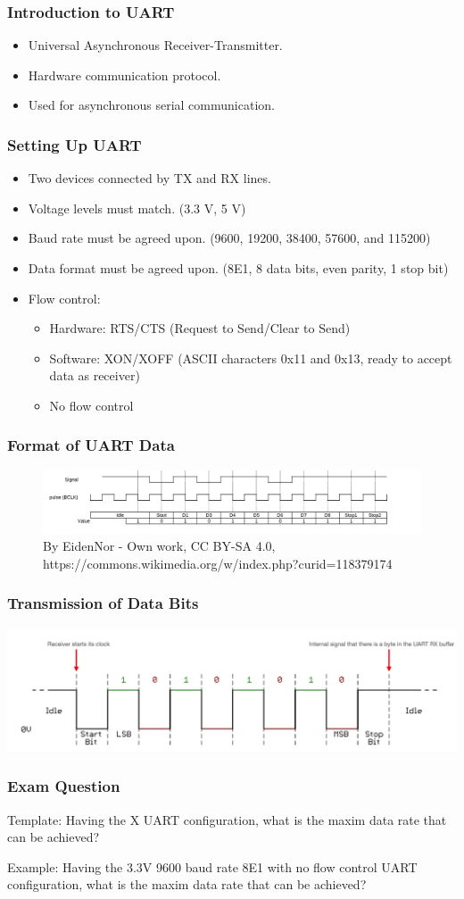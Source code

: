 
\begin{frame}
    \frametitle{Introduction to UART}
    \begin{itemize}
        \item Universal Asynchronous Receiver-Transmitter.
        \item Hardware communication protocol.
        \item Used for asynchronous serial communication.
    \end{itemize}
\end{frame}

\begin{frame}
    \frametitle{Setting Up UART}
    \begin{itemize}
        \item Two devices connected by TX and RX lines.
        \item Voltage levels must match. (3.3 V, 5 V)
        \item Baud rate must be agreed upon. (9600, 19200, 38400, 57600, and 115200)
        \item Data format must be agreed upon. (8E1, 8 data bits, even parity, 1 stop bit)
        \item Flow control:
        \begin{itemize}
            \item Hardware: RTS/CTS (Request to Send/Clear to Send)
            \item Software: XON/XOFF (ASCII characters 0x11 and 0x13, ready to accept data as receiver)
            \item No flow control
        \end{itemize}
    \end{itemize}
\end{frame}

\begin{frame}
    \frametitle{Format of UART Data}
    \begin{figure}
        \includegraphics[width=0.9\linewidth]{media/UART.png}
        \caption{By EidenNor - Own work, CC BY-SA 4.0, https://commons.wikimedia.org/w/index.php?curid=118379174}
    \end{figure}
\end{frame}

\begin{frame}
    \frametitle{Transmission of Data Bits}
    \includegraphics[width=0.8\linewidth]{media/uart_timing.png}
\end{frame}


\begin{frame}
    \frametitle{Exam Question}
    Template: Having the X UART configuration, what is the maxim data rate that can be achieved?

    Example: Having the 3.3V 9600 baud rate 8E1 with no flow control UART configuration, what is the maxim data rate that can be achieved?
\end{frame}
